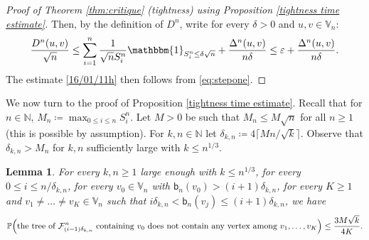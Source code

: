 \documentclass[11pt]{article}
\theoremstyle{plain}
\newtheorem{lemma}[theorem]{Lemma}
\theoremstyle{definition}
\theoremstyle{remark}
\newcommand{\N}{\mathbb{N}} %
\newcommand{\1}{\mathbbm{1}} %
\newcommand{\proba}[1]{\mathbb{P}\left(#1\right)} %
\newcommand{\F}{\mathcal{F}} %
\newcommand{\birth}{\mathsf{b}} %
\newcommand{\V}{\mathbb{V}} %
\newcommand{\dc}{D} %
\let\originalleft\left
\let\originalright\right
\renewcommand{\left}{\mathopen{}\mathclose\bgroup\originalleft}
\renewcommand{\right}{\aftergroup\egroup\originalright}
\begin{document}
\begin{proof}[Proof of Theorem \ref{thm:critique} (tightness) using Proposition \ref{tightness time estimate}]
Then, by the definition of $\dc^{n}$, write for every $\delta>0$ and $u,v \in \V_{n}$:
\[  \frac{\dc^n(u,v)}{\sqrt{n}} \leq \sum_{i=1}^n  \frac{1}{\sqrt{n} S^n_{i}} \mathbbm{1}_{S^n_{i}\leq \delta \sqrt{n}}+ \frac{\Delta^{n}(u,v)}{n \delta} \leq \varepsilon+ \frac{\Delta^{n}(u,v)}{n \delta} .\]
The estimate \eqref{16/01/11h} then follows from \eqref{eq:stepone}.
\end{proof}







We now turn to the proof of Proposition \ref{tightness time estimate}. {Recall that for $n\in \N$, $M_{n}\coloneqq\max_{0\leq i \leq n} S^n_i$.} Let $M>0$ be such that $M_{n} \leq M \sqrt{n}$ for all $n \geq 1$ {(this is possible by assumption)}. {For $k,n\in \N$ let $\delta_{k,n}\coloneqq 4 \lceil Mn/\sqrt{k} \rceil$.} Observe that $\delta_{k,n}>M_{n}$ for $k,n$ sufficiently large with $k \leq n^{1/3}$.


\begin{lemma} \label{OneStepTightness}
For every $k,n \geq 1$ large enough with $k \leq n^{1/3}$, for every {$ 0 \leq i \leq n/ \delta_{k,n}$}, for every  $v_{0} \in \V_{n}$ with {$\birth_{n}(v_{0}) > (i+1) \delta_{k,n}$}, for every $K \geq 1$ and { $v_{1}\neq \ldots \neq v_{K} \in \V_{n}$ such that  $i \delta_{k,n} < \birth_{n}(v_{j}) \leq (i+1) \delta_{k,n}  $}, we have
\[
\proba{\textrm{the tree of } \F^{n}_{ (i-1)\delta_{k,n} } \textrm{ containing } v_0 \textrm{ does not contain any vertex among } v_{1}, \ldots,v_{K}} \leq \frac{3 M \sqrt{k}}{4 K}.
\]
\end{lemma}
\end{document}
